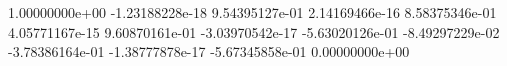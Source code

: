  1.00000000e+00
 -1.23188228e-18
 9.54395127e-01
 2.14169466e-16
 8.58375346e-01
 4.05771167e-15
 9.60870161e-01
 -3.03970542e-17
 -5.63020126e-01
 -8.49297229e-02
 -3.78386164e-01
 -1.38777878e-17
 -5.67345858e-01
 0.00000000e+00
